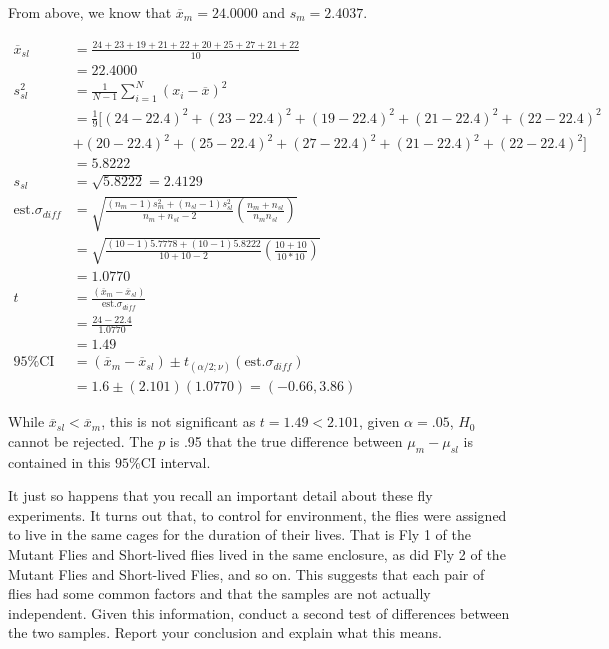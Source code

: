 \documentclass[onecolumn,10pt]{jhwhw}
\begin{document}
From above, we know that $\overline{x}_m = 24.0000$ and $s_m = 2.4037$.

\begin{equation*}
\begin{split}
\overline{x}_{sl} & = \frac{24 + 23 + 19 + 21 + 22 + 20 + 25 + 27 + 21 + 22}{10} \\
             & = 22.4000 \\
s^2_{sl} & = \frac{1}{N-1} \sum_{i=1}^N (x_i - \overline{x})^2 \\
    & = \frac{1}{9} [(24-22.4)^2 + (23-22.4)^2 + (19-22.4)^2 + (21-22.4)^2 + (22-22.4)^2  \\
    & + (20-22.4)^2 + (25-22.4)^2 + (27-22.4)^2 + (21-22.4)^2 + (22-22.4)^2] \\
    & = 5.8222 \\
s_{sl} & = \sqrt{5.8222} = 2.4129\\
%
\mbox{est.} \sigma_{diff} & = \sqrt{\frac{(n_m-1)s^2_m + (n_{sl}-1)s^2_{sl}}{n_m + n_{sl} - 2} \left( \frac{n_m + n_{sl}}{n_m n_{sl}} \right)} \\
& = \sqrt{\frac{(10-1)5.7778 + (10-1)5.8222}{10 + 10 - 2} \left( \frac{10 + 10}{10*10} \right)} \\
& = 1.0770\\
%
t & = \frac{\left( \overline{x}_m - \overline{x}_{sl} \right)}{\mbox{est.} \sigma_{diff}} \\
  & = \frac{24 - 22.4}{1.0770} \\
  & = 1.49\\
%
\mbox{95\% CI} & = (\overline{x}_m - \overline{x}_{sl}) \pm t_{(\alpha/2;\nu)} (\mbox{est.} \sigma_{diff}) \\
& = 1.6 \pm (2.101) (1.0770) = (-0.66,3.86)
\end{split}
\end{equation*}

While $\overline{x}_{sl} < \overline{x}_m$, this is not significant as $t = 1.49 < 2.101$, given $\alpha = .05$, $H_0$ cannot be rejected. The $p$ is .95 that the true difference between $\mu_m - \mu_{sl}$ is contained in this $\mbox{95\% CI}$ interval.

\problem{}
It just so happens that you recall an important detail about these fly experiments. It turns out that, to control for environment, the flies were assigned to live in the same cages for the duration of their lives. That is Fly 1 of the Mutant Flies and Short-lived flies lived in the same enclosure, as did Fly 2 of the Mutant Flies and Short-lived Flies, and so on. This suggests that each pair of flies had some common factors and that the samples are not actually independent. Given this information, conduct a second test of differences between the two samples. Report your conclusion and explain what this means.
\end{document}
